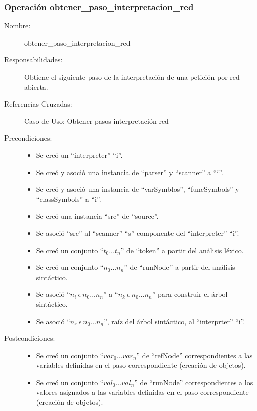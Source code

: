 \subsubsection{Operación obtener\_paso\_interpretacion\_red}
\FloatBarrier
\begin{framed}
	\begin{description}
		\item [Nombre:] obtener\_paso\_interpretacion\_red
		\item [Responsabilidades:] Obtiene el siguiente paso de la interpretación de una petición por red abierta.
		\item [Referencias Cruzadas: ] Caso de Uso: Obtener pasos interpretación red
      \item [Precondiciones:] \hfill
      \begin {itemize}
         \item Se creó un ``interpreter'' ``i''.
         \item Se creó y asoció una instancia de ``parser'' y ``scanner'' a ``i''.
         \item Se creó y asoció una instancia de ``varSymblos'', ``funcSymbols'' y ``classSymbols'' a ``i''.
         \item Se creó una instancia ``src'' de ``source''.
         \item Se asoció ``src'' al ``scanner'' ``s'' componente del ``interpreter'' ``i''. 
         \item Se creó un conjunto ``$t_0...t_n$'' de ``token'' a partir del análisis léxico.
         \item Se creó un conjunto ``$n_0...n_n$'' de ``runNode'' a partir del análisis sintáctico.
         \item Se asoció ``$n_i\ \epsilon\ n_0...n_n$'' a ``$n_k\ \epsilon\ n_0...n_n$'' para construir el árbol sintáctico.
         \item Se asoció  ``$n_r\ \epsilon\ n_0...n_n$'', raíz del árbol sintáctico, al ``interprter'' ``i''.
      \end{itemize}
      \item [Postcondiciones:] \hfill
      \begin {itemize}
         \item Se creó un conjunto ``$var_0...var_n$'' de ``refNode'' correspondientes a las variables definidas en el paso correspondiente (creación de objetos).
         \item Se creó un conjunto ``$val_0...val_n$'' de ``runNode'' correspondientes a los valores asignados a las variables definidas en el paso correspondiente (creación de objetos).

\end{itemize}
\end{description}
\end{framed}
